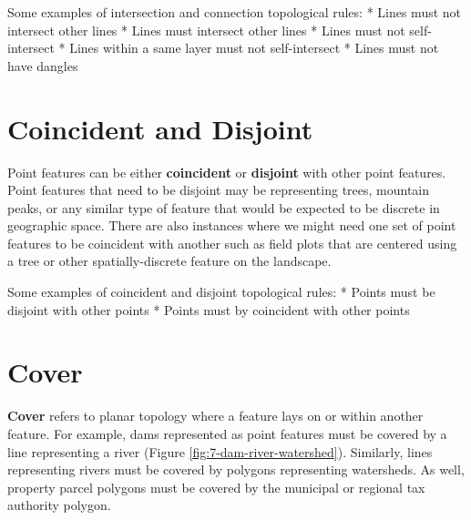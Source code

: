 \documentclass[
]{book}
\begin{document}
Some examples of intersection and connection topological rules:
* Lines must not intersect other lines
* Lines must intersect other lines
* Lines must not self-intersect
* Lines within a same layer must not self-intersect
* Lines must not have dangles

\hypertarget{coincident-and-disjoint}{%
\section{Coincident and Disjoint}\label{coincident-and-disjoint}}

Point features can be either \textbf{coincident} or \textbf{disjoint} with other point features. Point features that need to be disjoint may be representing trees, mountain peaks, or any similar type of feature that would be expected to be discrete in geographic space. There are also instances where we might need one set of point features to be coincident with another such as field plots that are centered using a tree or other spatially-discrete feature on the landscape.

Some examples of coincident and disjoint topological rules:
* Points must be disjoint with other points
* Points must by coincident with other points

\hypertarget{cover}{%
\section{Cover}\label{cover}}

\textbf{Cover} refers to planar topology where a feature lays on or within another feature. For example, dams represented as point features must be covered by a line representing a river (Figure \ref{fig:7-dam-river-watershed}). Similarly, lines representing rivers must be covered by polygons representing watersheds. As well, property parcel polygons must be covered by the municipal or regional tax authority polygon.
\end{document}
